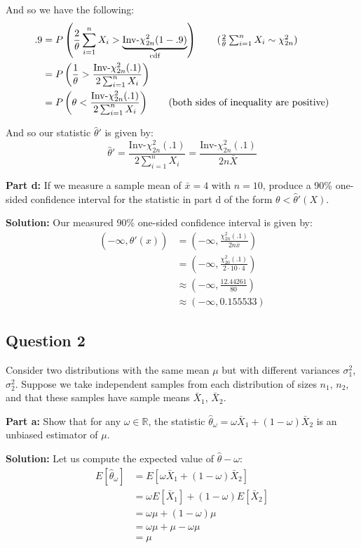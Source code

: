 \documentclass{article}
\begin{document}
And so we have the following:
\begin{align*}
    .9&=P\left(\frac{2}{\theta}\sum_{i=1}^nX_i>\underbrace{\text{Inv-}\chi^2_{2n}(1-.9)}_{\text{cdf}}\right)\tag{$\frac{2}{\theta}\sum_{i=1}^nX_i\sim\chi^2_{2n}$}\\
    &=P\left(\frac{1}{\theta}>\frac{\text{Inv-}\chi^2_{2n}(.1)}{2\sum_{i=1}^nX_i}\right)\\
    &=P\left(\theta<\frac{\text{Inv-}\chi^2_{2n}(.1)}{2\sum_{i=1}^nX_i}\right)\tag{both sides of inequality are positive}\\
\end{align*}

And so our statistic $\hat\theta'$ is given by:
$$\hat\theta'=\frac{\text{Inv-}\chi^2_{2n}(.1)}{2\sum_{i=1}^nX_i}=\frac{\text{Inv-}\chi^2_{2n}(.1)}{2n\bar X}$$
\bigskip

\noindent\textbf{Part d:} If we measure a sample mean of $\bar x=4$ with $n=10$, produce a 90\% one-sided confidence interval for the statistic in part d of the form $\theta<\hat\theta'(X)$.
\bigskip

\noindent\textbf{Solution:} Our measured 90\% one-sided confidence interval is given by:
\begin{align*}
    (-\infty,\hat\theta'(x))&=\left(-\infty,\frac{\chi^2_{2n}(.1)}{2n\bar x}\right)\tag{part c}\\
    &=\left(-\infty,\frac{\chi^2_{20}(.1)}{2\cdot10\cdot 4}\right)\\
    &\approx\left(-\infty,\frac{12.44261}{80}\right)\\
    &\approx(-\infty,0.155533)
\end{align*}

\subsection*{Question 2}
Consider two distributions with the same mean $\mu$ but with different variances $\sigma^2_1$, $\sigma^2_2$. Suppose we take independent samples from each distribution of sizes $n_1$, $n_2$, and that these samples have sample means $\bar X_1$, $\bar X_2$.
\bigskip

\noindent\textbf{Part a:} Show that for any $\omega\in\mathbb R$, the statistic $\hat\theta_\omega=\omega\bar X_1+(1-\omega)\bar X_2$ is an unbiased estimator of $\mu$.
\bigskip

\noindent\textbf{Solution:} Let us compute the expected value of $\hat\theta-\omega$:
\begin{align*}
    E[\hat\theta_\omega]&=E[\omega\bar X_1+(1-\omega)\bar X_2]\tag{def. of $\hat\theta_\omega$}\\
    &=\omega E[\bar X_1]+(1-\omega)E[\bar X_2]\tag{linearity of expectation}\\
    &=\omega\mu+(1-\omega)\mu\tag{mean of sample mean}\\
    &=\omega\mu+\mu-\omega\mu\\
    &=\mu
\end{align*}
\end{document}
